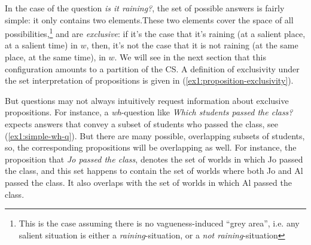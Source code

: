 In the case of the question \textit{is it raining?}, the set of possible answers is fairly simple: it only contains two elements.These two elements  cover the space of all possibilities,\footnote{This is the case assuming there is no vagueness-induced ``grey area'', i.e. any salient situation is either a \textit{raining}-situation, or a \textit{not raining}-situation} and are \textit{exclusive}: if it's the case that it's raining (at a salient place, at a salient time) in $w$, then, it's not the case that it is not raining (at the same place, at the same time), in $w$. We will see in the next section that this configuration amounts to a partition of the CS. A definition of exclusivity under the set interpretation of propositions is given in (\ref{ex1:proposition-exclusivity}).

\begin{exe}
	\label{ex1:proposition-exclusivity}
\end{exe}


But questions may not always intuitively request information about exclusive propositions. For instance, a \textit{wh}-question like \textit{Which students passed the class?} expects answers that convey a subset of students who passed the class, see (\ref{ex1:simple-wh-q}). But there are many possible, overlapping subsets of students, so, the corresponding propositions will be overlapping as well. For instance, the proposition that \textit{Jo passed the class}, denotes the set of worlds in which Jo passed the class, and this set happens to contain the set of worlds where both Jo and Al passed the class. It also overlaps with the set of worlds in which Al passed the class. 

\begin{exe}
	\label{ex1:simple-wh-q}
\end{exe} 

